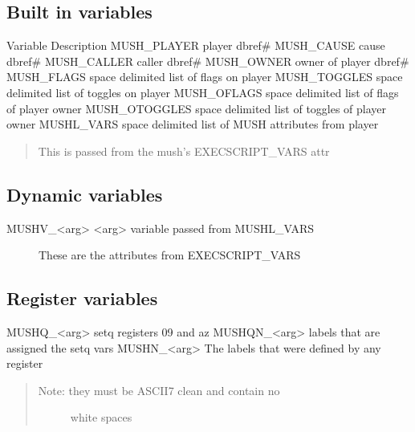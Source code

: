\documentclass[letterpaper,10pt,english]{sphinxmanual}
\begin{document}
\subsection{Built in variables}
\label{\detokenize{20-execscript:built-in-variables}}
\sphinxAtStartPar
Variable                   Description
MUSH\_PLAYER                player dbref\#
MUSH\_CAUSE                 cause dbref\#
MUSH\_CALLER                caller dbref\#
MUSH\_OWNER                 owner of player dbref\#
MUSH\_FLAGS                 space delimited list of flags on player
MUSH\_TOGGLES               space delimited list of toggles on player
MUSH\_OFLAGS                space delimited list of flags of player owner
MUSH\_OTOGGLES              space delimited list of toggles of player owner
MUSHL\_VARS                 space delimited list of MUSH attributes from player
\begin{quote}

\sphinxAtStartPar
This is passed from the mush’s EXECSCRIPT\_VARS attr
\end{quote}


\subsection{Dynamic variables}
\label{\detokenize{20-execscript:dynamic-variables}}\begin{description}
\item[{MUSHV\_\textless{}arg\textgreater{}                \textless{}arg\textgreater{} variable passed from MUSHL\_VARS}] \leavevmode
\sphinxAtStartPar
These are the attributes from EXECSCRIPT\_VARS

\end{description}


\subsection{Register variables}
\label{\detokenize{20-execscript:register-variables}}
\sphinxAtStartPar
MUSHQ\_\textless{}arg\textgreater{}                setq registers 0\sphinxhyphen{}9 and a\sphinxhyphen{}z
MUSHQN\_\textless{}arg\textgreater{}               labels that are assigned the setq vars
MUSHN\_\textless{}arg\textgreater{}                The labels that were defined by any register
\begin{quote}
\begin{description}
\item[{Note: they must be ASCII\sphinxhyphen{}7 clean and contain no}] \leavevmode
\sphinxAtStartPar
white spaces

\end{description}
\end{quote}
\end{document}
